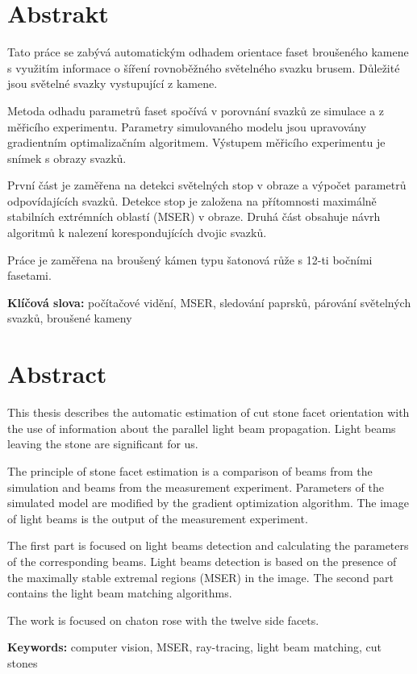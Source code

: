 \section*{Abstrakt}
Tato práce se zabývá automatickým odhadem orientace faset broušeného kamene s využitím informace o šíření rovnoběžného světelného svazku brusem. Důležité jsou světelné svazky vystupující z kamene. 

Metoda odhadu parametrů faset spočívá v porovnání svazků ze simulace a z měřicího experimentu. Parametry simulovaného modelu jsou upravovány gradientním optimalizačním algoritmem. Výstupem měřicího experimentu je snímek s obrazy svazků.

 První část je zaměřena na detekci světelných stop v obraze a výpočet parametrů odpovídajících svazků. Detekce stop je založena na přítomnosti maximálně stabilních extrémních oblastí (MSER) v obraze. Druhá část obsahuje návrh algoritmů k nalezení korespondujících dvojic svazků.   

Práce je zaměřena na broušený kámen typu šatonová růže s 12-ti bočními fasetami.

\textbf{Klíčová slova:} počítačové vidění, MSER, sledování paprsků, párování světelných svazků, broušené kameny 

\section*{Abstract}

This thesis describes the automatic estimation of cut stone facet orientation with the use of information about  the parallel light beam propagation. Light beams leaving the stone are significant for us.

The principle of stone facet estimation is a comparison of beams from the simulation and beams from the measurement experiment. Parameters of the simulated model are modified by the gradient optimization algorithm.  The image of light beams is the output of the measurement experiment. 

The first part is focused on light beams detection and calculating the parameters of the corresponding beams. Light beams detection is based on the presence of the maximally stable extremal regions (MSER) in the image. The second part contains the light beam matching algorithms.

The work is focused on chaton rose with the twelve side facets.


\textbf{Keywords:} computer vision, MSER, ray-tracing, light beam matching, cut stones
